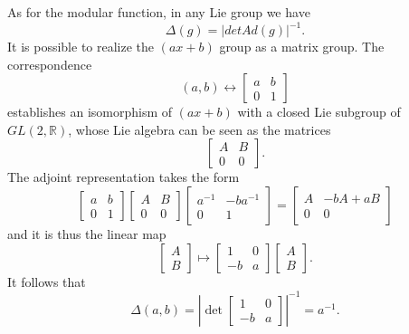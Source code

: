 \documentclass[a4paper,11pt]{article} %
\numberwithin{equation}{section} %
\numberwithin{figure}{section} %
\begin{document}
As for the modular function, in any Lie group we have
\begin{equation}
 \Delta(g)=|det Ad(g)|^{-1}.
\end{equation}
It is possible to realize the $(ax+b)$ group as a matrix group. The correspondence
\begin{equation}
(a,b)\leftrightarrow
\begin{bmatrix} 
a&b\\0&1
\end{bmatrix} 
\end{equation}
establishes an isomorphism of $(ax+b)$ with a closed Lie subgroup of $GL(2,\mathbb{R})$, whose Lie algebra can be seen as the matrices
\begin{equation}
\begin{bmatrix} 
A&B\\0&0
\end{bmatrix}. 
\end{equation}
The adjoint representation takes the form
\begin{equation}
\begin{bmatrix} 
a&b\\0&1
\end{bmatrix}
\begin{bmatrix} 
A&B\\0&0
\end{bmatrix}
\begin{bmatrix} 
a^{-1}&-ba^{-1}\\0&1
\end{bmatrix}
=
\begin{bmatrix} 
A&-bA+aB\\0&0
\end{bmatrix} 
\end{equation}
and it is thus the linear map
\begin{equation}
\begin{bmatrix} 
A\\B
\end{bmatrix}
\mapsto
\begin{bmatrix} 
1&0\\-b&a
\end{bmatrix}
\begin{bmatrix} 
A\\B
\end{bmatrix}. 
\end{equation}
It follows that
\begin{equation}
\Delta(a,b)=|\det
\begin{bmatrix} 
1&0\\-b&a
\end{bmatrix}
|^{-1}=a^{-1}. 
\end{equation}
\end{document}
